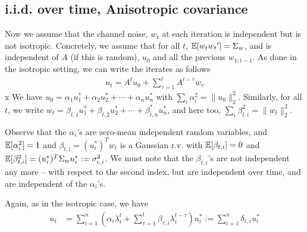 \documentclass[10pt]{article}
\newcommand{\nsrmax}{\text{NSR}}
\begin{document}



\subsection{i.i.d. over time, Anisotropic covariance}
Now we assume that the channel noise, $w_t$ at each iteration is independent but is not isotropic. Concretely, we assume that for all $t$, $\mathbb{E}[w_t w_t{}'] = \Sigma_w$, and is independent of $A$ (if this is random), $u_0$ and all the previous $w_{1:t-1}$. As done in the isotropic setting, we can write the iterates as follows
\begin{align*}
u_t = A^t u_0 + \sum_{\tau = 1}^t A^{t-\tau} w_\tau
\end{align*}
x
We have $u_0 = \alpha_1 u_1^* + \alpha_2 u_2^* + \cdots + \alpha_n u_n^*$ with $\sum_i \alpha_i^2 = \|u_0\|_2^2$. Similarly, for all $t$, we write $w_t = \beta_{t,1} u_1^* + \beta_{t,2} u_2^* +  \cdots + \beta_{t,n}^* u_n^*$, and here too, $\sum_i \beta_{t,i}^2 = \|w_t\|_2^2$. 

Observe that the $\alpha_i$'s are zero-mean independent random variables, and $\mathbb{E}[\alpha_i^2] = 1$ and $\beta_{t,i} = (u_i^*)^T w_t$ is a Gaussian r.v. with $\mathbb{E}[\beta_{t,i}] = 0$ and $\mathbb{E}[\beta_{t,i}^2] = (u_i^*)^T \Sigma_w u_i^* := \sigma_{c,i}^2$. We must note that the $\beta_{t,i}$'s are not independent any more -- with respect to the second index, but are independent over time, and are independent of the $\alpha_i$'s. 

Again, as in the isotropic case, we have 
\begin{align*}
u_t &= \sum_{i=1}^n \left(\alpha_i \lambda_i^t + \sum_{\tau=1}^t  \beta_{\tau,i} \lambda_i^{t - \tau}\right) u_i^*  := \sum_{i=1}^n \delta_{t,i}  u_i^*
\end{align*}
\end{document}
